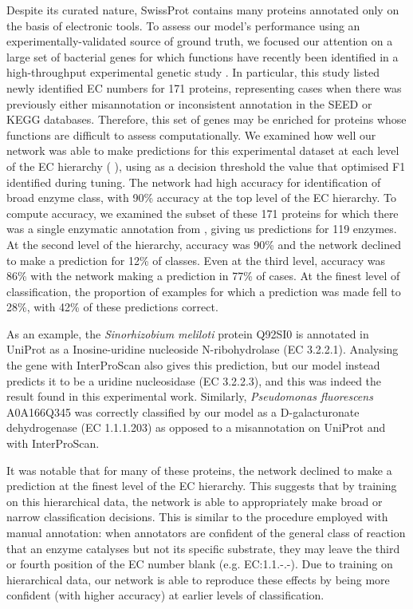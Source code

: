 Despite its curated nature, SwissProt contains many proteins annotated only on the basis of electronic tools. To assess our model's performance using an experimentally-validated source of ground truth, we focused our attention on a large set of bacterial genes for which functions have recently been identified in a high-throughput experimental genetic study \citep{phenotypes}. In particular, this study listed newly identified EC numbers for 171 proteins, representing cases when there was previously either misannotation or inconsistent annotation in the SEED or KEGG databases. Therefore, this set of genes may be enriched for proteins whose functions are difficult to assess computationally.
We examined how well our network was able to make predictions for this experimental dataset at each level of the EC hierarchy (%
), using as a decision threshold the value that optimised F1 identified during tuning. The network had high accuracy for identification of broad enzyme class, with 90\% accuracy at the top level of the EC hierarchy. To compute accuracy, we examined the subset of these 171 proteins for which there was a single enzymatic annotation from \cite{phenotypes}, giving us predictions for 119 enzymes. At the second level of the hierarchy, accuracy was 90\% and the network declined to make a prediction for 12\% of classes. Even at the third level, accuracy was 86\% with the network making a prediction in 77\% of cases. At the finest level of classification, the proportion of examples for which a prediction was made fell to 28\%, with 42\% of these predictions correct.

As an  example, the \textit{Sinorhizobium meliloti} protein Q92SI0 is annotated in UniProt as a Inosine-uridine nucleoside N-ribohydrolase (EC 3.2.2.1).  Analysing the gene with InterProScan \citep{interproscan} also gives this prediction, but our model instead predicts it to be a uridine nucleosidase (EC 3.2.2.3), and this was indeed the result found in this experimental work. Similarly, \textit{Pseudomonas fluorescens} A0A166Q345 was correctly classified by our model as a D-galacturonate dehydrogenase (EC 1.1.1.203) as opposed to a misannotation on UniProt and with InterProScan.


It was notable that for many of these proteins, the network declined to make a prediction at the finest level of the EC hierarchy. This suggests that by training on this hierarchical data, the network is able to appropriately make broad or narrow classification decisions. This is similar to the procedure employed with manual annotation: when annotators are confident of the general class of reaction that an enzyme catalyses but not its specific substrate, they may leave the third or fourth position of the EC number blank (e.g. EC:1.1.-.-). Due to training on hierarchical data, our network is able to reproduce these effects by being more confident (with higher accuracy) at earlier levels of classification.

